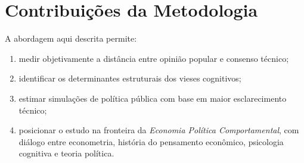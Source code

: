 
\section{Contribuições da Metodologia}

A abordagem aqui descrita permite:
\begin{enumerate}[label=\alph*)]
    \item medir objetivamente a distância entre opinião popular e consenso técnico;
    \item identificar os determinantes estruturais dos vieses cognitivos;
    \item estimar simulações de política pública com base em maior esclarecimento técnico;
    \item posicionar o estudo na fronteira da \textit{Economia Política Comportamental}, com diálogo entre econometria, história do pensamento econômico, psicologia cognitiva e teoria política.
\end{enumerate}